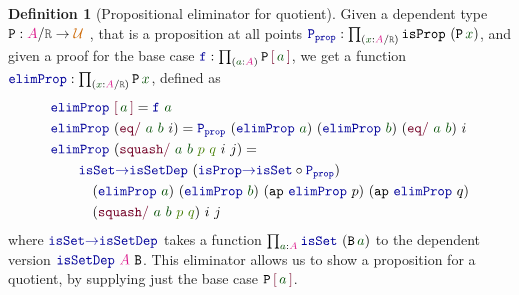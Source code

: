 \documentclass[twoside,11pt,openright]{report}
\theoremstyle{plain} %
\theoremstyle{definition}
\newtheorem{defn}[thm]{Definition}%
\theoremstyle{remark}
\newcommand*{\term}[1]{\textcolor{green!30!black}{#1}} %
\newcommand*{\pathterm}[1]{\textcolor{green!65!red!75!black}{#1}}
\newcommand*{\type}[1]{\textcolor{magenta!90!black}{#1}}
\newcommand*{\universe}[1]{\textcolor{orange!80!black}{#1}}
\newcommand*{\relation}[1]{\textcolor{gray!75!black}{\ensuremath{\mathtt{#1}}}}
\newcommand*{\function}[1]{\textcolor{blue!60!black}{\ensuremath{\mathtt{#1}}}}
\newcommand*{\constructor}[1]{\textcolor{purple!60!black}{\ensuremath{\mathtt{#1}}}}
\newcommand*{\typeformer}[1]{\ensuremath{\mathtt{#1}}}
\newcommand*{\quotientconstructor}[1]{\constructor{[}\,#1\,\constructor{]}}
\begin{document}
\begin{defn}[Propositional eliminator for quotient]
  \label{defn:propositional-elimination-quotient}
  Given a dependent type \(\typeformer{P} : \type{A} / \relation{R} \rightarrow \universe{\mathcal{U}}\) , that is a proposition at all points \(\function{P_{prop}} : \prod_{(\term{x} : \type{A} / \relation{R})} \typeformer{isProp}~(\typeformer{P}\,\term{x})\), and given a proof for the base case \(\function{f} : \prod_{(\term{a} : \type{A})} \typeformer{P}\,\quotientconstructor{\term{a}}\), we get a function \(\function{elimProp} : \prod_{(\term{x} : \type{A} / \relation{R})} \typeformer{P}\,\term{x}\), defined as
  \begin{equation}
    \begin{aligned}
      &\function{elimProp}~\quotientconstructor{\term{a}} = \function{f}~\term{a}\\
      &\function{elimProp}~(\constructor{eq/}~\term{a}~\term{b}~i) = \function{P_{prop}}~(\function{elimProp}~\term{a})~(\function{elimProp}~\term{b})~(\constructor{eq/}~\term{a}~\term{b})~i \\
      &\function{elimProp}~(\constructor{squash/}~\term{a}~\term{b}~\pathterm{p}~\pathterm{q}~i~j) = \\
      &\qquad\function{isSet{\rightarrow}isSetDep}~(\function{isProp{\rightarrow}isSet} \circ \function{P_{prop}}) \\
      &\qquad\quad (\function{elimProp}~\term{a})~(\function{elimProp}~\term{b})~(\mathtt{ap}~\function{elimProp}~p)~(\mathtt{ap}~\function{elimProp}~q)\\
      &\qquad\quad (\constructor{squash/}~\term{a}~\term{b}~\pathterm{p}~\pathterm{q})~i~j
    \end{aligned}
  \end{equation}
  where \(\function{isSet{\rightarrow}isSetDep}\) takes a function \(\prod_{\term{a} : \type{A}} \function{isSet}~(\typeformer{B}\,\term{a})\) to the dependent version \(\function{isSetDep}~\type{A}~\typeformer{B}\). This eliminator allows us to show a proposition for a quotient, by supplying just the base case \(\typeformer{P}\,\quotientconstructor{\term{a}}\).
\end{defn}
\end{document}
